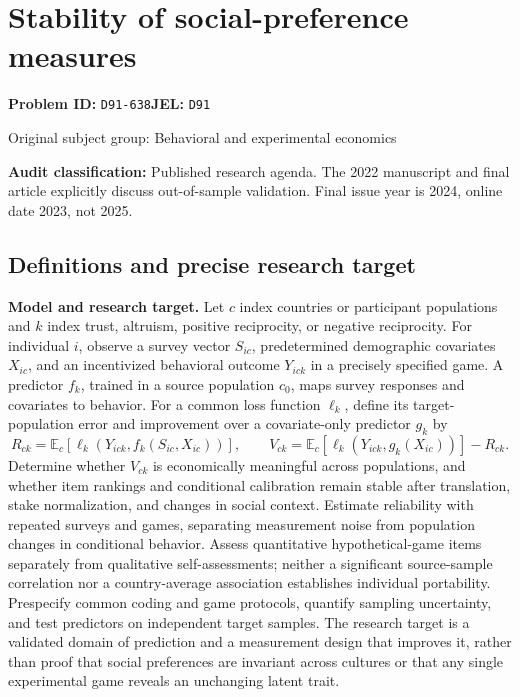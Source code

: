 \documentclass[11pt,a4paper]{article}
\begin{document}
\section*{Stability of social-preference measures}
\textbf{Problem ID:} \texttt{D91-638}\quad \textbf{JEL:} \texttt{D91}\par
\label{problem:OP-0303}
{\sffamily\small\color{muted}Original subject group: Behavioral and experimental economics\par}
\label{definitions:problem:30007585}
\textbf{Audit classification:} Published research agenda. The 2022 manuscript and final article explicitly discuss out-of-sample validation. Final issue year is 2024, online date 2023, not 2025.
\subsection*{Definitions and precise research target}
\textbf{Model and research target.} Let \(c\) index countries or participant populations and \(k\) index trust, altruism, positive reciprocity, or negative reciprocity. For individual \(i\), observe a survey vector \(S_{ic}\), predetermined demographic covariates \(X_{ic}\), and an incentivized behavioral outcome \(Y_{ick}\) in a precisely specified game. A predictor \(f_k\), trained in a source population \(c_0\), maps survey responses and covariates to behavior. For a common loss function \(\ell_k\), define its target-population error and improvement over a covariate-only predictor \(g_k\) by
\[R_{ck}=\mathbb E_c[\ell_k(Y_{ick},f_k(S_{ic},X_{ic}))],\qquad V_{ck}=\mathbb E_c[\ell_k(Y_{ick},g_k(X_{ic}))]-R_{ck}.\]
Determine whether \(V_{ck}\) is economically meaningful across populations, and whether item rankings and conditional calibration remain stable after translation, stake normalization, and changes in social context. Estimate reliability with repeated surveys and games, separating measurement noise from population changes in conditional behavior. Assess quantitative hypothetical-game items separately from qualitative self-assessments; neither a significant source-sample correlation nor a country-average association establishes individual portability. Prespecify common coding and game protocols, quantify sampling uncertainty, and test predictors on independent target samples. The research target is a validated domain of prediction and a measurement design that improves it, rather than proof that social preferences are invariant across cultures or that any single experimental game reveals an unchanging latent trait.
\end{document}
